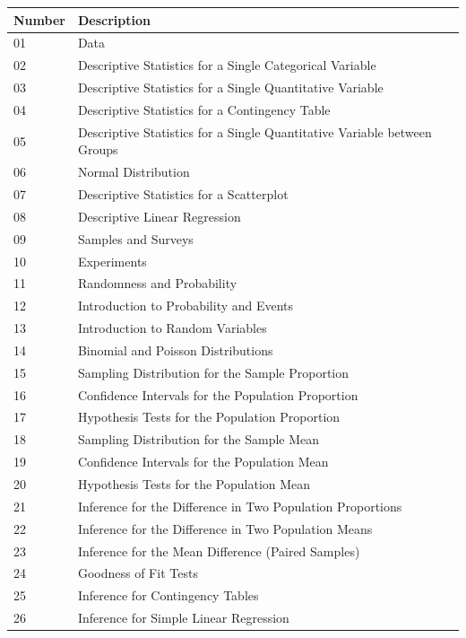 \documentclass[11pt,a4paper,oldfontcommands,openany]{memoir}
\numberwithin{equation}{section} %
\begin{document}
\begin{center}
\label{tab:topics}
\begin{tabular} { | l | l | }
\hline \textbf{Number} & \textbf{Description} \\
\hline
01 & Data \\
\hline
02  & Descriptive Statistics for a Single Categorical Variable \\
\hline
03 & Descriptive Statistics for a Single Quantitative Variable \\
\hline
04 & Descriptive Statistics for a Contingency Table \\
\hline
05 & Descriptive Statistics for a Single Quantitative Variable between Groups \\
\hline
06 & Normal Distribution \\
\hline
07 & Descriptive Statistics for a Scatterplot \\
\hline
08 & Descriptive Linear Regression \\
\hline
09 & Samples and Surveys \\
\hline
10 & Experiments \\
\hline
11 & Randomness and Probability \\
\hline
12 & Introduction to Probability and Events \\
\hline
13 & Introduction to Random Variables \\
\hline
14 & Binomial and Poisson Distributions \\
\hline
15 & Sampling Distribution for the Sample Proportion \\
\hline
16 & Confidence Intervals for the Population Proportion \\
\hline
17 & Hypothesis Tests for the Population Proportion \\
\hline
18 & Sampling Distribution for the Sample Mean \\
\hline
19 & Confidence Intervals for the Population Mean \\
\hline
20 & Hypothesis Tests for the Population Mean \\
\hline
21 & Inference for the Difference in Two Population Proportions \\
\hline
22 & Inference for the Difference in Two Population Means \\
\hline
23 & Inference for the Mean Difference (Paired Samples) \\
\hline
24 & Goodness of Fit Tests \\
\hline
25 & Inference for Contingency Tables \\
\hline
26 & Inference for Simple Linear Regression \\
\hline
\end{tabular}
\end{center}
\end{document}

